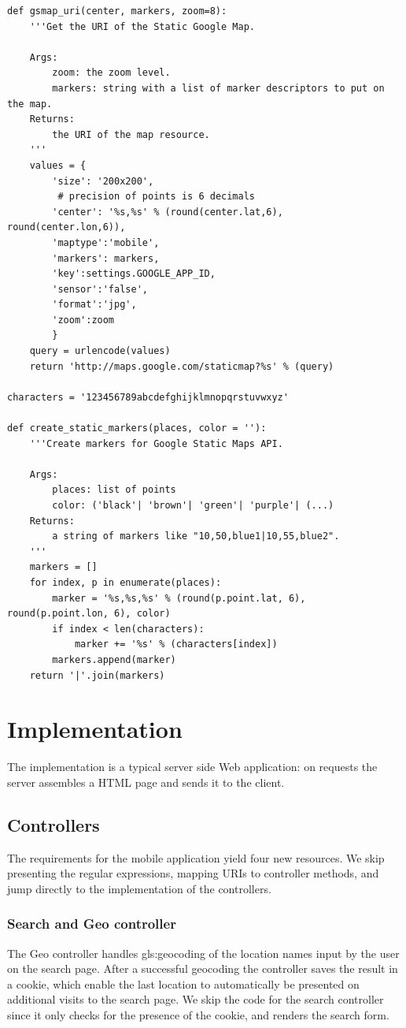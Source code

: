 \begin{lstlisting}[caption=Google Static Maps URI creator,label=lst:gsmaps_creator]
def gsmap_uri(center, markers, zoom=8):
    '''Get the URI of the Static Google Map.
    
    Args:
        zoom: the zoom level.
        markers: string with a list of marker descriptors to put on the map.
    Returns:
        the URI of the map resource.
    '''
    values = {
        'size': '200x200',
         # precision of points is 6 decimals
        'center': '%s,%s' % (round(center.lat,6), round(center.lon,6)),
        'maptype':'mobile',
        'markers': markers,
        'key':settings.GOOGLE_APP_ID,
        'sensor':'false',
        'format':'jpg',
        'zoom':zoom
        }
    query = urlencode(values)
    return 'http://maps.google.com/staticmap?%s' % (query)

characters = '123456789abcdefghijklmnopqrstuvwxyz'
   
def create_static_markers(places, color = ''):
    '''Create markers for Google Static Maps API.
    
    Args:
        places: list of points
        color: ('black'| 'brown'| 'green'| 'purple'| (...)
    Returns:
        a string of markers like "10,50,blue1|10,55,blue2".
    '''
    markers = []
    for index, p in enumerate(places):
        marker = '%s,%s,%s' % (round(p.point.lat, 6), round(p.point.lon, 6), color)
        if index < len(characters):
            marker += '%s' % (characters[index])
        markers.append(marker) 
    return '|'.join(markers)
\end{lstlisting}


\section{Implementation}
The implementation is a typical server side Web application: on requests the
server assembles a HTML page and sends it to the client. 

\subsection{Controllers}
The requirements for the mobile application yield four new resources. We skip
presenting the regular expressions, mapping URIs to controller methods, and jump
directly to the implementation of the controllers.

\subsubsection{Search and Geo controller}
The Geo controller handles \gls{gls:geocoding} of the location names
input by the user on the search page. After a successful geocoding the controller
saves the result in a cookie, which enable the last location to automatically be
presented on additional visits to the search page. We skip the code for the
search controller since it only checks for the presence of the cookie, and
renders the search form. 

